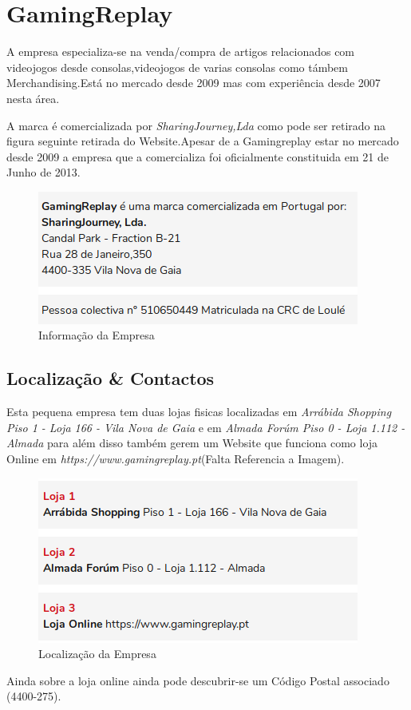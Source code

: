 \section{GamingReplay}

A empresa especializa-se na venda/compra de artigos relacionados com videojogos desde consolas,videojogos de varias consolas como támbem Merchandising.Está no mercado desde 2009 mas com experiência desde 2007 nesta área.

A marca é comercializada por \emph{SharingJourney,Lda} como pode ser retirado na figura seguinte retirada do Website.Apesar de a Gamingreplay estar no mercado desde 2009 a empresa que a comercializa foi oficialmente constituida em 21 de Junho de 2013.

\begin{figure}[h!]
\caption{Informação da Empresa}
\includegraphics{Images/LocEmpresa.png}
\end{figure}

\subsection{Localização \& Contactos}

Esta pequena empresa tem duas lojas fisicas localizadas em \emph{Arrábida Shopping Piso 1 - Loja 166 - Vila Nova de Gaia} e em \emph{Almada Forúm Piso 0 - Loja 1.112 - Almada} para além disso também gerem um Website que funciona como loja Online em \emph{https://www.gamingreplay.pt}(Falta Referencia a Imagem).
\begin{figure}[h!]
\caption{Localização da Empresa}
\includegraphics{Images/LocLojas.png}
\end{figure}
Ainda sobre a loja online ainda pode descubrir-se um Código Postal associado (4400-275).

